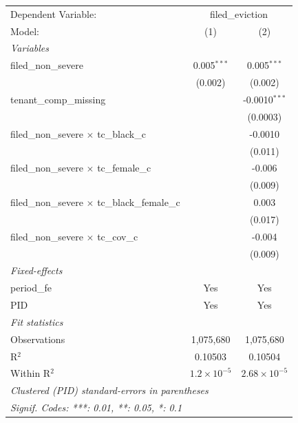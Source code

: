 \par\endgroup
\begingroup
\centering
\begin{tabular}{lcc}
   \tabularnewline \midrule \midrule
   Dependent Variable: & \multicolumn{2}{c}{filed\_eviction}\\
   Model:                                                 & (1)                  & (2)\\  
   \midrule
   \emph{Variables}\\
   filed\_non\_severe                                     & 0.005$^{***}$        & 0.005$^{***}$\\   
                                                          & (0.002)              & (0.002)\\   
   tenant\_comp\_missing                                  &                      & -0.0010$^{***}$\\   
                                                          &                      & (0.0003)\\   
   filed\_non\_severe $\times$ tc\_black\_c               &                      & -0.0010\\   
                                                          &                      & (0.011)\\   
   filed\_non\_severe $\times$ tc\_female\_c              &                      & -0.006\\   
                                                          &                      & (0.009)\\   
   filed\_non\_severe $\times$ tc\_black\_female\_c       &                      & 0.003\\   
                                                          &                      & (0.017)\\   
   filed\_non\_severe $\times$ tc\_cov\_c                 &                      & -0.004\\   
                                                          &                      & (0.009)\\   
   \midrule
   \emph{Fixed-effects}\\
   period\_fe                                             & Yes                  & Yes\\  
   PID                                                    & Yes                  & Yes\\  
   \midrule
   \emph{Fit statistics}\\
   Observations                                           & 1,075,680            & 1,075,680\\  
   R$^2$                                                  & 0.10503              & 0.10504\\  
   Within R$^2$                                           & $1.2\times 10^{-5}$  & $2.68\times 10^{-5}$\\   
   \midrule \midrule
   \multicolumn{3}{l}{\emph{Clustered (PID) standard-errors in parentheses}}\\
   \multicolumn{3}{l}{\emph{Signif. Codes: ***: 0.01, **: 0.05, *: 0.1}}\\
\end{tabular}
